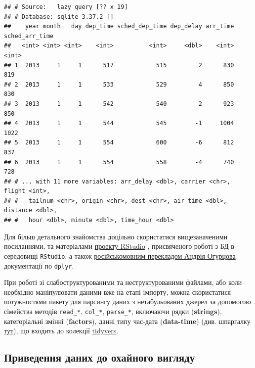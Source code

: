\documentclass[
]{book}
\begin{document}
\begin{verbatim}
## # Source:   lazy query [?? x 19]
## # Database: sqlite 3.37.2 []
##    year month   day dep_time sched_dep_time dep_delay arr_time sched_arr_time
##   <int> <int> <int>    <int>          <int>     <dbl>    <int>          <int>
## 1  2013     1     1      517            515         2      830            819
## 2  2013     1     1      533            529         4      850            830
## 3  2013     1     1      542            540         2      923            850
## 4  2013     1     1      544            545        -1     1004           1022
## 5  2013     1     1      554            600        -6      812            837
## 6  2013     1     1      554            558        -4      740            728
## # ... with 11 more variables: arr_delay <dbl>, carrier <chr>, flight <int>,
## #   tailnum <chr>, origin <chr>, dest <chr>, air_time <dbl>, distance <dbl>,
## #   hour <dbl>, minute <dbl>, time_hour <dbl>
\end{verbatim}

Для більш детального знайомства доцільно скористатися вищезаначеними посиланнями, та матеріалами \href{https://db.rstudio.com/dplyr/}{проекту RStudio} \citep{R-dbplyr}, присвяченого роботі з БД в середовищі \texttt{RStudio}, а також \href{http://biostat-r.blogspot.com/2015/07/dplyr-databases.html\#more}{російськомовним перекладом Андрія Огурцова} документації по \texttt{dplyr}.

При роботі зі слабоструктурованими та неструктурованими файлами, або коли необхідно маніпулювати даними вже на етапі імпорту, можна скористатися потужностями пакету \citep{R-reader} для парсингу даних з нетабульованих джерел за допомогою сімейства методів \texttt{read\_*}, \texttt{col\_*}, \texttt{parse\_*}, включаючи рядки (\textbf{strings}), категоріальні змінні (\textbf{factors}), данні типу час-дата (\textbf{data-time}) (див. шпаргалку \href{doc/data-import.pdf}{тут}), що входить до колекції \href{https://www.tidyverse.org/}{tidyvers}.

\hypertarget{ux43fux440ux438ux432ux435ux434ux435ux43dux43dux44f-ux434ux430ux43dux438ux445-ux434ux43e-ux43eux445ux430ux439ux43dux43eux433ux43e-ux432ux438ux433ux43bux44fux434ux443}{%
\subsection{Приведення даних до охайного вигляду}\label{ux43fux440ux438ux432ux435ux434ux435ux43dux43dux44f-ux434ux430ux43dux438ux445-ux434ux43e-ux43eux445ux430ux439ux43dux43eux433ux43e-ux432ux438ux433ux43bux44fux434ux443}}
\end{document}

